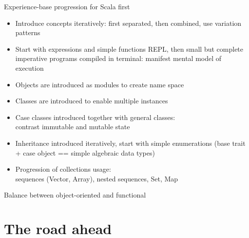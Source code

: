 \documentclass[aspectratio=169]{beamer}
\newcommand{\EndSlide}{\begin{frame}[plain]\endpage\end{frame}}
\newcommand{\Section}[1]{\titleimagecolor{red}\section{#1}}
\newenvironment{Slide}[1]%
  {\begin{frame}[environment=Slide]{#1}}
  {\end{frame}}%
\begin{document}
\begin{Slide}{Experience-base progression for Scala first}
 \begin{itemize}
 \item  Introduce concepts iteratively: first separated, then combined,  use variation patterns  
 \item Start with expressions and simple functions REPL, then small but complete imperative programs compiled in terminal: manifest mental model of execution
  \item Objects are introduced as modules to create name space
  \item Classes are introduced to enable multiple instances
  \item Case classes introduced together with general classes: \\
   contrast immutable and mutable state
  \item Inheritance introduced iteratively, start with simple enumerations (base trait + case object == simple algebraic data types)
  \item Progression of collections usage: \\ sequences (Vector, Array), nested sequences, Set, Map 
\end{itemize}
\end{Slide}  


\begin{Slide}{Balance between object-oriented and functional}
  
\end{Slide}  


\Section{The road ahead}


\EndSlide
\end{document}
